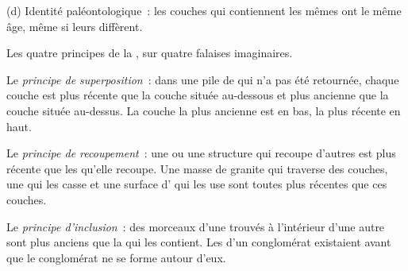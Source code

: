 \begin{omfigure}
\begin{minipage}[t]{0.49\linewidth}
{\small (d) Identité paléontologique~: les couches qui contiennent les
mêmes  ont le même âge, même si leurs  diffèrent.}
\end{minipage}

\medskip
{\small Les quatre principes de la , sur quatre falaises
imaginaires.}
\label{fig:g7:geological-time:principles}
\end{omfigure}

\begin{definition}\label{def:g7:geological-time:superposition}
Le \emph{principe de superposition}~:
dans une pile de  qui n'a pas été retournée, chaque
couche est plus récente que la couche située au-dessous et plus ancienne
que la couche située au-dessus. La couche la plus ancienne est en bas, la
plus récente en haut.
\end{definition}

\begin{definition}\label{def:g7:geological-time:cross-cutting}
Le \emph{principe de recoupement}~: une
 ou une structure qui recoupe d'autres  est plus récente que
les  qu'elle recoupe. Une masse de granite qui traverse des couches,
une  qui les casse et une surface d' qui les use sont toutes
plus récentes que ces couches.
\end{definition}

\begin{definition}\label{def:g7:geological-time:inclusion}
Le \emph{principe d'inclusion}~: des morceaux
d'une  trouvés à l'intérieur d'une autre  sont plus anciens que
la  qui les contient. Les  d'un conglomérat existaient avant
que le conglomérat ne se forme autour d'eux.
\end{definition}

